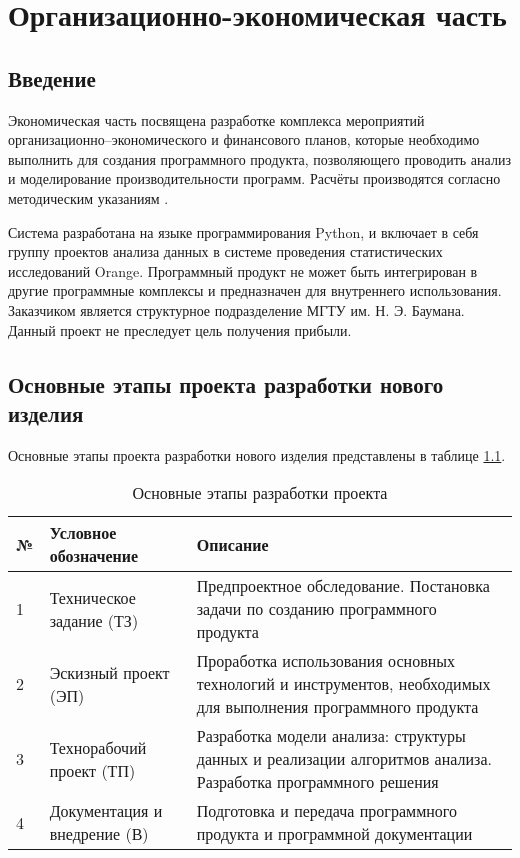 \chapter{Организационно-экономическая часть}
\setcounter{section}{4}
\section{Введение}
Экономическая часть посвящена разработке комплекса мероприятий организационно–экономического и финансового планов, которые необходимо выполнить для создания программного продукта, позволяющего проводить анализ и моделирование производительности программ. Расчёты производятся согласно методическим указаниям \cite{economics}.

Система разработана на языке программирования Python, и включает в себя группу проектов анализа данных в системе проведения статистических исследований Orange. Программный продукт не может быть интегрирован в другие программные комплексы и предназначен для внутреннего использования. Заказчиком является структурное подразделение МГТУ им. Н. Э. Баумана.
Данный проект не преследует цель получения прибыли.

\section{Основные этапы проекта разработки нового изделия}
Основные этапы проекта разработки нового изделия представлены в таблице \ref{tab:development-stages}.

\begin{table}[H]
    \caption{\label{tab:development-stages}Основные этапы разработки проекта}
    \begin{tabular}[H]{|l|p{5cm}|p{8cm}|}
        \hline
        № & Условное обозначение & Описание\\
        \hline
        1 & Техническое задание (ТЗ) & Предпроектное обследование. Постановка задачи по созданию программного продукта\\
        \hline
        2 & Эскизный проект (ЭП) & Проработка использования основных технологий и инструментов, необходимых для выполнения программного продукта\\
        \hline
        3 & Технорабочий проект (ТП) & Разработка модели анализа: структуры данных и реализации алгоритмов анализа. Разработка программного решения\\
        \hline
        4 & Документация и внедрение (В) & Подготовка и передача программного продукта и программной документации\\
        \hline
    \end{tabular}
\end{table}

